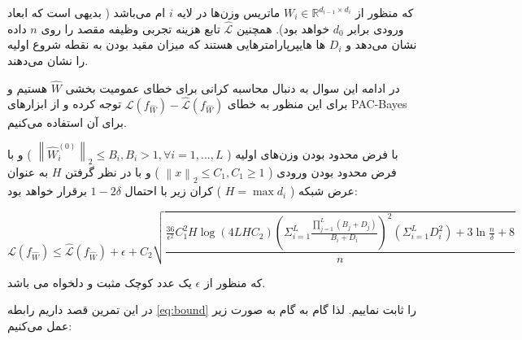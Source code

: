 \documentclass{article}
\begin{document}
که منظور از 
$W_i \in \mathbb{R}^{d_{i-1} \times d_i}$
ماتریس وزن‌ها در لایه 
$i$
ام می‌باشد
(
بدیهی است که ابعاد ورودی برابر 
$d_0$
خواهد بود).
همچنین 
$\hat{\mathcal{L}}$
تابع هزینه تجربی وظیفه مقصد را روی 
$n$
داده
نشان می‌دهد و 
$D_i$
ها هایپرپارامترهایی هستند که میزان مقید بودن به نقطه شروع اولیه را نشان می‌دهند.

در ادامه این سوال به دنبال محاسبه کرانی برای خطای عمومیت بخشی 
$\hat{W}$
هستیم و برای این منظور 
به خطای 
$\mathcal{L}(f_{\hat{W}}) - \hat{\mathcal{L}}(f_{\hat{W}})$
توجه کرده و از ابزارهای 
PAC-Bayes
برای آن استفاده می‌کنیم.

با فرض محدود بودن وزن‌های اولیه
(
$
\left\lVert \hat{W}_i^{(0)} \right\rVert_2 \leq B_i , B_i > 1, \forall i = 1,...,L
$
) و 
با فرض 
محدود بودن ورودی
(
$
\left\lVert x \right\rVert_2 \leq C_1 , C_1 \geq 1
$
) و 
با در نظر گرفتن 
$H$
به عنوان عرض شبکه 
(
$H =\max d_i$
)
کران زیر با احتمال
$1 - 2\delta$
برقرار خواهد بود:



\begin{equation} \label{eq:bound}
    \mathcal{L}(f_{\hat{W}}) \leq \hat{\mathcal{L}}(f_{\hat{W}}) + \epsilon + C_2\sqrt{\frac{\frac{36}{\epsilon^2}C_1^{2}H\log{(4LHC_2)}(\Sigma^{L}_{i = 1}\frac{\prod^{L}_{j = 1}(B_j + D_j)}{B_i + D_i})^2(\Sigma^{L}_{i = 1}D_i^2) + 3\ln \frac{n}{\delta} + 8}{n}}
\end{equation}


که منظور از 
$\epsilon$
یک عدد کوچک  مثبت و دلخواه می باشد.

در این تمرین قصد داریم رابطه
\ref{eq:bound}
را ثابت نماییم.
لذا گام به گام به صورت زیر عمل می‌کنیم:
\end{document}
